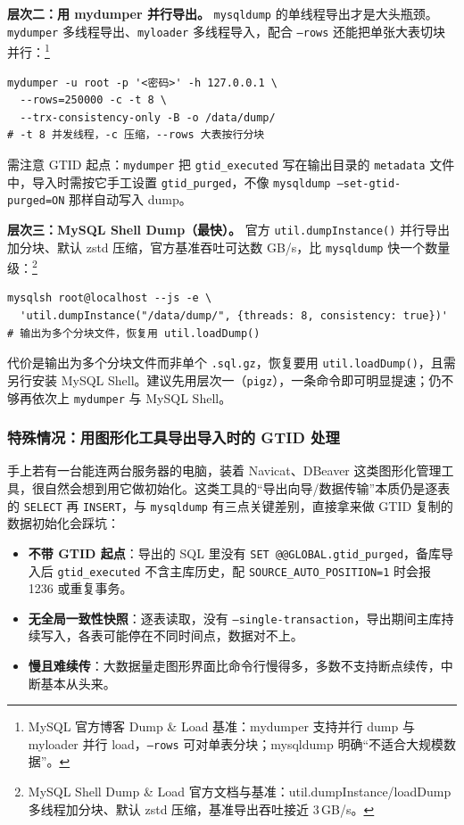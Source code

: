 \documentclass[12pt,UTF8]{ctexbook}
\begin{document}
\textbf{层次二：用 mydumper 并行导出。} \texttt{mysqldump} 的单线程导出才是大头瓶颈。\texttt{mydumper} 多线程导出、\texttt{myloader} 多线程导入，配合 \texttt{--rows} 还能把单张大表切块并行：\footnote{MySQL 官方博客 Dump \& Load 基准：mydumper 支持并行 dump 与 myloader 并行 load，\texttt{--rows} 可对单表分块；mysqldump 明确“不适合大规模数据”。}

\begin{lstlisting}
mydumper -u root -p '<密码>' -h 127.0.0.1 \
  --rows=250000 -c -t 8 \
  --trx-consistency-only -B -o /data/dump/
# -t 8 并发线程，-c 压缩，--rows 大表按行分块
\end{lstlisting}

需注意 GTID 起点：\texttt{mydumper} 把 \texttt{gtid\_executed} 写在输出目录的 \texttt{metadata} 文件中，导入时需按它手工设置 \texttt{gtid\_purged}，不像 \texttt{mysqldump --set-gtid-purged=ON} 那样自动写入 dump。

\textbf{层次三：MySQL Shell Dump（最快）。} 官方 \texttt{util.dumpInstance()} 并行导出加分块、默认 zstd 压缩，官方基准吞吐可达数 GB/s，比 \texttt{mysqldump} 快一个数量级：\footnote{MySQL Shell Dump \& Load 官方文档与基准：util.dumpInstance/loadDump 多线程加分块、默认 zstd 压缩，基准导出吞吐接近 3\,GB/s。}

\begin{lstlisting}
mysqlsh root@localhost --js -e \
  'util.dumpInstance("/data/dump/", {threads: 8, consistency: true})'
# 输出为多个分块文件，恢复用 util.loadDump()
\end{lstlisting}

代价是输出为多个分块文件而非单个 \texttt{.sql.gz}，恢复要用 \texttt{util.loadDump()}，且需另行安装 MySQL Shell。建议先用层次一（\texttt{pigz}），一条命令即可明显提速；仍不够再依次上 \texttt{mydumper} 与 MySQL Shell。

\subsubsection{特殊情况：用图形化工具导出导入时的 GTID 处理}

手上若有一台能连两台服务器的电脑，装着 Navicat、DBeaver 这类图形化管理工具，很自然会想到用它做初始化。这类工具的“导出向导/数据传输”本质仍是逐表的 \texttt{SELECT} 再 \texttt{INSERT}，与 \texttt{mysqldump} 有三点关键差别，直接拿来做 GTID 复制的数据初始化会踩坑：

\begin{itemize}[leftmargin=2cm]
  \item \textbf{不带 GTID 起点}：导出的 SQL 里没有 \texttt{SET @@GLOBAL.gtid\_purged}，备库导入后 \texttt{gtid\_executed} 不含主库历史，配 \texttt{SOURCE\_AUTO\_POSITION=1} 时会报 1236 或重复事务。
  \item \textbf{无全局一致性快照}：逐表读取，没有 \texttt{--single-transaction}，导出期间主库持续写入，各表可能停在不同时间点，数据对不上。
  \item \textbf{慢且难续传}：大数据量走图形界面比命令行慢得多，多数不支持断点续传，中断基本从头来。
\end{itemize}
\end{document}
